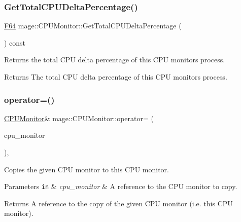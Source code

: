 \subsubsection{\texorpdfstring{Get\+Total\+C\+P\+U\+Delta\+Percentage()}{GetTotalCPUDeltaPercentage()}}
{\footnotesize\ttfamily \hyperlink{namespacemage_ad26233bbec640deda836e572c1a23708}{F64} mage\+::\+C\+P\+U\+Monitor\+::\+Get\+Total\+C\+P\+U\+Delta\+Percentage (\begin{DoxyParamCaption}{ }\end{DoxyParamCaption}) const\hspace{0.3cm}{\ttfamily [noexcept]}}

Returns the total C\+PU delta percentage of this C\+PU monitor\textquotesingle{}s process.

\begin{DoxyReturn}{Returns}
The total C\+PU delta percentage of this C\+PU monitor\textquotesingle{}s process. 
\end{DoxyReturn}
\hypertarget{classmage_1_1_c_p_u_monitor_a878cc9fd170e6c34ee28f06591b06eeb}{}\label{classmage_1_1_c_p_u_monitor_a878cc9fd170e6c34ee28f06591b06eeb} 
\subsubsection{\texorpdfstring{operator=()}{operator=()}\hspace{0.1cm}{\footnotesize\ttfamily [1/2]}}
{\footnotesize\ttfamily \hyperlink{classmage_1_1_c_p_u_monitor}{C\+P\+U\+Monitor}\& mage\+::\+C\+P\+U\+Monitor\+::operator= (\begin{DoxyParamCaption}\item[{const \hyperlink{classmage_1_1_c_p_u_monitor}{C\+P\+U\+Monitor} \&}]{cpu\+\_\+monitor }\end{DoxyParamCaption})\hspace{0.3cm}{\ttfamily [default]}, {\ttfamily [noexcept]}}

Copies the given C\+PU monitor to this C\+PU monitor.


\begin{DoxyParams}[1]{Parameters}
\mbox{\tt in}  & {\em cpu\+\_\+monitor} & A reference to the C\+PU monitor to copy. \\
\hline
\end{DoxyParams}
\begin{DoxyReturn}{Returns}
A reference to the copy of the given C\+PU monitor (i.\+e. this C\+PU monitor). 
\end{DoxyReturn}
\hypertarget{classmage_1_1_c_p_u_monitor_af1eacba414b2db72cf13d335f78785cd}{}\label{classmage_1_1_c_p_u_monitor_af1eacba414b2db72cf13d335f78785cd} 
